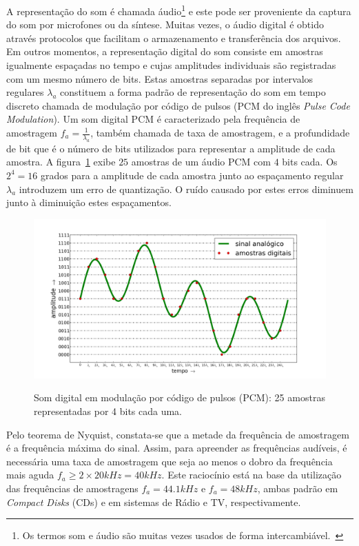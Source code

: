 A representação do som é chamada áudio\footnote{Os termos
som e áudio são muitas vezes usados de forma intercambiável.~\cite{Everest}} e este pode ser proveniente da captura do som por microfones ou da síntese. Muitas vezes, o áudio digital é obtido através protocolos que facilitam o armazenamento e transferência dos arquivos.~\cite{procFala} Em outros momentos, a representação digital do som consiste em amostras igualmente espaçadas no tempo e cujas amplitudes individuais são registradas com um mesmo número de bits. Estas amostras separadas por intervalos regulares $\lambda_a$ constituem a forma padrão de representação do som em tempo discreto chamada de modulação por código de pulsos (PCM do inglês \emph{Pulse Code Modulation}).
Um som digital PCM é caracterizado pela frequência de amostragem $f_a=\frac{1}{\lambda_a}$, também chamada de taxa de amostragem, e a profundidade de bit que é o número de bits utilizados para representar a amplitude de cada amostra.\cite{protocolosAudio} A figura~\ref{fig:PCM} exibe $25$ amostras de um áudio PCM com $4$ bits cada. Os $2^4=16$ grados para a amplitude de cada amostra junto ao espaçamento regular $\lambda_a$ introduzem um erro de quantização. O ruído causado por estes erros diminuem junto à diminuição estes espaçamentos. 


\begin{figure}[h!]
    \centering
    \caption{Som digital em modulação por código de pulsos (PCM): 25 amostras representadas por 4 bits cada uma.}
        \includegraphics[width=\textwidth]{figuras/pcm}
        \label{fig:PCM}
\end{figure}

Pelo teorema de Nyquist, constata-se que a metade da frequência de amostragem é a frequência máxima do sinal. Assim, para apreender as frequências audíveis, é necessária uma taxa de amostragem que seja ao menos o dobro da frequência mais aguda $f_a \geq 2\times 20kHz=40kHz$. Este raciocínio está na base da utilização das frequências de amostragens $f_a=44.1kHz$ e $f_a=48kHz$, ambas padrão em \emph{Compact Disks} (CDs) e em sistemas de Rádio e TV, respectivamente.\cite{protocolosAudio}


